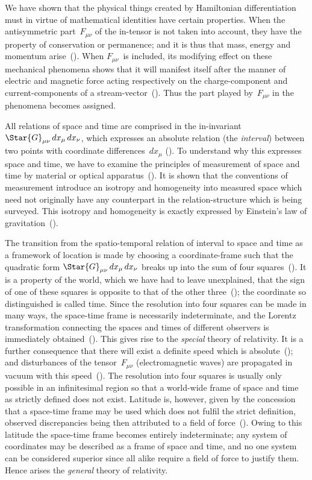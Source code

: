 \documentclass[12pt]{book}
\begin{document}
We have shown that the physical things created by Hamiltonian differentiation
%
%
must in virtue of mathematical identities have certain properties. When
the antisymmetric part~$F_{\mu\nu}$ of the in-tensor is not taken into account, they
have the property of conservation or permanence; and it is thus that mass,
energy and momentum arise~(). When $F_{\mu\nu}$~is included, its modifying effect
on these mechanical phenomena shows that it will manifest itself after the
manner of electric and magnetic force acting respectively on the charge-component
and current-components of a stream-vector~(). Thus the part played
by~$F_{\mu\nu}$ in the phenomena becomes assigned.

All relations of space and time are comprised in the in-invariant $\Star{G}_{\mu\nu}\, dx_{\mu}\, dx_{\nu}$,
which expresses an absolute relation (the \emph{interval}) between two points with
coordinate differences~$dx_{\mu}$ (). To understand why this expresses space and
time, we have to examine the principles of measurement of space and time by
material or optical apparatus~(). It is shown that the conventions of measurement
introduce an isotropy and homogeneity into measured space which need
not originally have any counterpart in the relation-structure which is being
surveyed. This isotropy and homogeneity is exactly expressed by Einstein's
law of gravitation~().

The transition from the spatio-temporal relation of interval to space and
time as a framework of location is made by choosing a coordinate-frame such
that the quadratic form $\Star{G}_{\mu\nu}\, dx_{\mu}\, dx_{\nu}$ breaks up into the sum of four squares~().
It is a property of the world, which we have had to leave unexplained, that
the sign of one of these squares is opposite to that of the other three~(); the
coordinate so distinguished is called time. Since the resolution into four squares
can be made in many ways, the space-time frame is necessarily indeterminate,
and the Lorentz transformation connecting the spaces and times of different
observers is immediately obtained~(). This gives rise to the \emph{special} theory of
relativity. It is a further consequence that there will exist a definite speed
which is absolute~(); and disturbances of the tensor~$F_{\mu\nu}$  (electromagnetic
waves) are propagated in vacuum with this speed~(). The resolution into
four squares is usually only possible in an infinitesimal region so that a world-wide
frame of space and time as strictly defined does not exist. Latitude is,
however, given by the concession that a space-time frame may be used which
does not fulfil the strict definition, observed discrepancies being then attributed
to a field of force~(). Owing to this latitude the space-time frame becomes
entirely indeterminate; any system of coordinates may be described as a frame
of space and time, and no one system can be considered superior since all alike
require a field of force to justify them. Hence arises the \emph{general} theory of
relativity.
\end{document}
